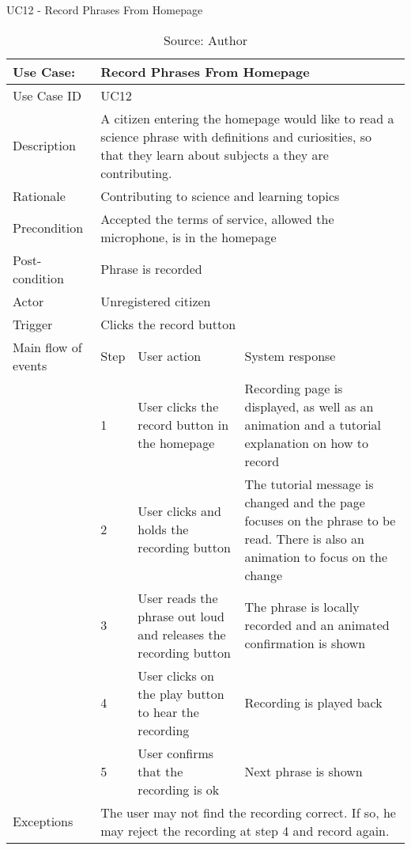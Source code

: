 \begin{table}[ht]
\centering
\caption{UC12 - Record Phrases From Homepage}
\label{uc:12}
\begin{tabular}{|p{3cm}|p{1cm}|p{5cm}|p{5cm}|}
\hline
Use Case:       & \multicolumn{3}{p{11cm}|}{Record Phrases From Homepage} \\ \hline
Use Case ID     & \multicolumn{3}{p{11cm}|}{UC12} \\ \hline
Description     & \multicolumn{3}{p{11cm}|}{A citizen entering the homepage would like to read a science phrase with definitions and curiosities, so that they learn about subjects a they are contributing.} \\ \hline
Rationale       & \multicolumn{3}{p{11cm}|}{Contributing to science and learning topics} \\ \hline
Precondition    & \multicolumn{3}{p{11cm}|}{Accepted the terms of service, allowed the microphone, is in the homepage} \\ \hline
Post-condition  & \multicolumn{3}{p{11cm}|}{Phrase is recorded} \\ \hline
Actor           & \multicolumn{3}{p{11cm}|}{Unregistered citizen} \\ \hline
Trigger         & \multicolumn{3}{p{11cm}|}{Clicks the record button} \\ \hline
Main flow of events & Step  & User action & System response \\ \hline
                    & 1     & User clicks the record button in the homepage & Recording page is displayed, as well as an animation and a tutorial explanation on how to record \\ \hline
                    & 2     & User clicks and holds the recording button & The tutorial message is changed and the page focuses on the phrase to be read. There is also an animation to focus on the change \\ \hline
                    & 3     & User reads the phrase out loud and releases the recording button & The phrase is locally recorded and an animated confirmation is shown \\ \hline
                    & 4     & User clicks on the play button to hear the recording & Recording is played back \\ \hline
                    & 5     & User confirms that the recording is ok & Next phrase is shown \\ \hline
Exceptions      & \multicolumn{3}{p{11cm}|}{The user may not find the recording correct. If so, he may reject the recording at step 4 and record again.} \\ \hline
\end{tabular}
\caption*{Source: Author}
\end{table}

